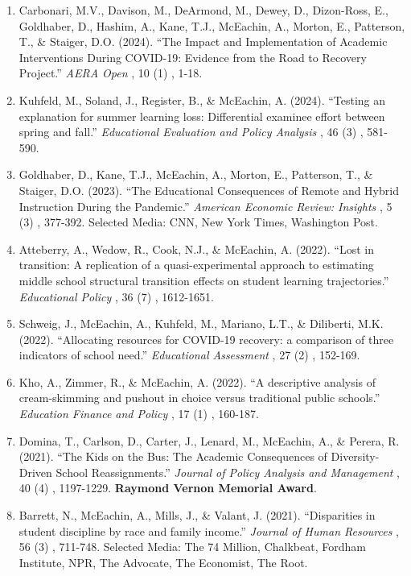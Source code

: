 \documentclass[11pt, letterpaper]{article}
\begin{document}
\begin{enumerate}[leftmargin=2em]
  \item Carbonari, M.V., Davison, M., DeArmond, M., Dewey, D., Dizon-Ross, E., Goldhaber, D., Hashim, A., Kane, T.J., McEachin, A., Morton, E., Patterson, T., \& Staiger, D.O. (2024).
  ``The Impact and Implementation of Academic Interventions During COVID-19: Evidence from the Road to Recovery Project.''
  \textit{AERA Open}%
, 10%
(1)%
, 1-18.

  \item Kuhfeld, M., Soland, J., Register, B., \& McEachin, A. (2024).
  ``Testing an explanation for summer learning loss: Differential examinee effort between spring and fall.''
  \textit{Educational Evaluation and Policy Analysis}%
, 46%
(3)%
, 581-590.

  \item Goldhaber, D., Kane, T.J., McEachin, A., Morton, E., Patterson, T., \& Staiger, D.O. (2023).
  ``The Educational Consequences of Remote and Hybrid Instruction During the Pandemic.''
  \textit{American Economic Review: Insights}%
, 5%
(3)%
, 377-392.
  Selected Media: CNN, New York Times, Washington Post.

  \item Atteberry, A., Wedow, R., Cook, N.J., \& McEachin, A. (2022).
  ``Lost in transition: A replication of a quasi-experimental approach to estimating middle school structural transition effects on student learning trajectories.''
  \textit{Educational Policy}%
, 36%
(7)%
, 1612-1651.

  \item Schweig, J., McEachin, A., Kuhfeld, M., Mariano, L.T., \& Diliberti, M.K. (2022).
  ``Allocating resources for COVID-19 recovery: a comparison of three indicators of school need.''
  \textit{Educational Assessment}%
, 27%
(2)%
, 152-169.

  \item Kho, A., Zimmer, R., \& McEachin, A. (2022).
  ``A descriptive analysis of cream-skimming and pushout in choice versus traditional public schools.''
  \textit{Education Finance and Policy}%
, 17%
(1)%
, 160-187.

  \item Domina, T., Carlson, D., Carter, J., Lenard, M., McEachin, A., \& Perera, R. (2021).
  ``The Kids on the Bus: The Academic Consequences of Diversity-Driven School Reassignments.''
  \textit{Journal of Policy Analysis and Management}%
, 40%
(4)%
, 1197-1229.
  \textbf{Raymond Vernon Memorial Award}.

  \item Barrett, N., McEachin, A., Mills, J., \& Valant, J. (2021).
  ``Disparities in student discipline by race and family income.''
  \textit{Journal of Human Resources}%
, 56%
(3)%
, 711-748.
  Selected Media: The 74 Million, Chalkbeat, Fordham Institute, NPR, The Advocate, The Economist, The Root.


\end{enumerate}
\end{document}
